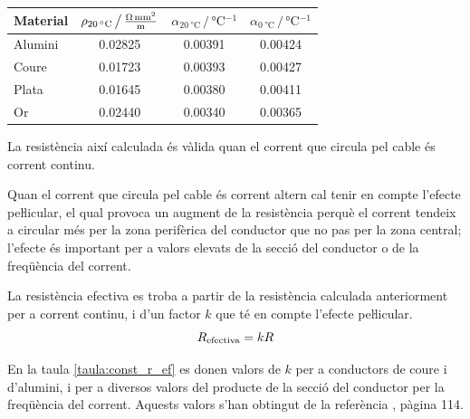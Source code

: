 \begin{center}
   \label{taula:param-elc}
   \begin{tabular}{lccc}
   \toprule[1pt]
   Material & $\rho_{\qty{20}{\degreeCelsius}} \,\big/\, \unit[per-mode = fraction]{\ohm\milli\metre\squared\per\metre}$ & $\alpha_{\qty{20}{\degreeCelsius}} \,\big/\, \unit{\degreeCelsius^{-1}}$ &
   $\alpha_{\qty{0}{\degreeCelsius}} \,\big/\, \unit{\degreeCelsius^{-1}}$
   \\
   \midrule
      Alumini & \num{0,02825} & \num{0,00391} & \num{0,00424} \\
      Coure   & \num{0,01723} & \num{0,00393} & \num{0,00427} \\
      Plata   & \num{0,01645} & \num{0,00380} & \num{0,00411} \\
      Or      & \num{0.02440} & \num{0.00340} & \num{0,00365} \\
   \bottomrule[1pt]
   \end{tabular}
\end{center}

La resistència així calculada és vàlida quan el corrent que circula
pel cable és corrent continu.

Quan el corrent que circula pel cable és
corrent altern cal tenir en compte l'efecte peŀlicular, el qual
 provoca un augment de la resistència  perquè el corrent
tendeix a circular més per la zona perifèrica del conductor que no pas per
la zona central; l'efecte és important per a valors elevats de la
secció del conductor o de la freqüència del corrent.

La resistència efectiva es troba a
partir de la resistència calculada anteriorment per a corrent
continu, i d'un factor $k$ que té en compte l'efecte peŀlicular.
\begin{equation}
   R_\mathrm{efectiva} = k R
\end{equation}

En la taula \vref{taula:const_r_ef} es donen valors de $k$ per a conductors de coure i d'alumini, i per a diversos valors del producte de la secció del conductor per la freqüència del corrent. Aquests valors s'han obtingut de la  referència \cite{RASa}, pàgina 114.


